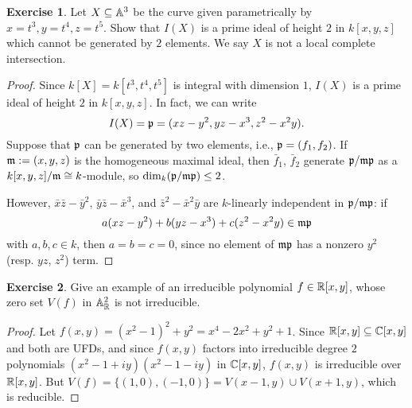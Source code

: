 \documentclass[11pt]{book}
\theoremstyle{definition}
\newtheorem{exercise}{Exercise}[section]
\begin{document}
\begin{exercise}
Let $X\subseteq\mathbb{A}^3$ be the curve given parametrically by $x=t^3,y=t^4,z=t^5$. Show that $I(X)$ is a prime ideal of height $2$ in $k[x,y,z]$ which cannot be generated by $2$ elements. We say $X$ is not a local complete intersection.
\end{exercise}
\begin{proof}
Since $k[X]=k[t^3,t^4,t^5]$ is integral with dimension $1$, $I(X)$ is a prime ideal of height $2$ in $k[x,y,z]$. In fact, we can write
\[I(X)=\mathfrak{p}=(xz-y^2,yz-x^3,z^2-x^2y).\]
Suppose that $\mathfrak{p}$ can be generated by two elements, i.e., $\mathfrak{p}=(f_1,f_2)$. If $\mathfrak{m}:=(x,y,z)$ is the homogeneous maximal ideal, then $\bar{f}_1$, $\bar{f}_2$ generate $\mathfrak{p}/\mathfrak{m}\mathfrak{p}$ as a $k[x,y,z]/\mathfrak{m}\cong k$-module, so $\dim_k(\mathfrak{p}/\mathfrak{m}\mathfrak{p})\leq 2$.\par
However, $\bar{x}\bar{z}-\bar{y}^2$, $\bar{y}\bar{z}-\bar{x}^3$, and $\bar{z}^2-\bar{x}^2\bar{y}$ are $k$-linearly independent in $\mathfrak{p}/\mathfrak{m}\mathfrak{p}$: if
\[a(xz-y^2)+b(yz-x^3)+c(z^2-x^2y)\in\mathfrak{m}\mathfrak{p}\]
with $a,b,c\in k$, then $a=b=c=0$, since no element of $\mathfrak{m}\mathfrak{p}$ has a nonzero $y^2$ (resp. $yz$, $z^2$) term.
\end{proof}
\begin{exercise}
Give an example of an irreducible polynomial $f\in\mathbb{R}[x,y]$, whose zero set $V(f)$ in $\mathbb{A}_{\mathbb{R}}^2$ is not irreducible.
\end{exercise}
\begin{proof}
Let $f(x,y)=(x^2-1)^2+y^2=x^4-2x^2+y^2+1$. Since $\mathbb{R}[x,y]\subseteq\mathbb{C}[x,y]$ and both are UFDs, and since $f(x,y)$ factors into irreducible degree $2$ polynomials $(x^2-1+iy)(x^2-1-iy)$ in $\mathbb{C}[x,y]$, $f(x,y)$ is irreducible over $\mathbb{R}[x,y]$. But $V(f)=\{(1,0),(-1,0)\}=V(x-1,y)\cup V(x+1,y)$, which is reducible.
\end{proof}
\end{document}
